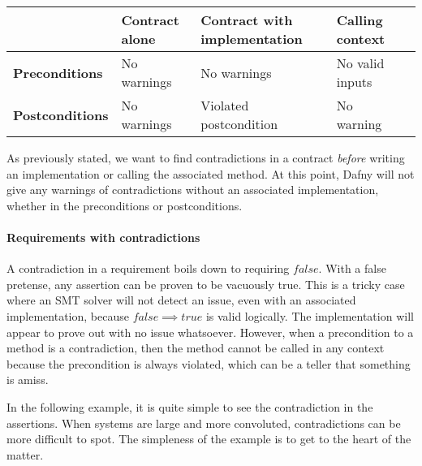 \documentclass{article}
\newif\ifcomments
\newcommand{\egm}[1]{\ifcomments\textcolor{orange}{egm: #1}\fi}
\newcommand{\cass}[1]{\ifcomments\textcolor{blue}{cass: #1}\fi}
\begin{document}
\begin{center}
\begin{tabularx}{0.9\textwidth} { 
  | >{\raggedright\arraybackslash}X 
  | >{\raggedright\arraybackslash}X 
  | >{\centering\arraybackslash}X 
  | >{\raggedright\arraybackslash}X 
  | >{\raggedleft\arraybackslash}X | }
     \hline
      & \textbf{Contract alone} & \textbf{Contract with implementation} & \textbf{Calling context} \\
     \hline
     \textbf{Preconditions} & No warnings  & No warnings & No valid inputs \\
     \hline
     \textbf{Postconditions}  & No warnings  & Violated postcondition & No warning \\
    \hline
\end{tabularx}
\label{tab:warn}
\end{center}

\egm{Add text to introduce the table and explain what the reader is looking it.}
\cass{Done}

As previously stated, we want to find contradictions in a contract {\it before} writing an implementation or calling the associated method. 
At this point, Dafny will not give any warnings of contradictions without an associated implementation, whether in the preconditions or postconditions. 

 \paragraph{Requirements with contradictions}

 A contradiction in a requirement boils down to requiring
 \(false\). With a false pretense, any assertion can be proven to be vacuously true. This is a tricky case
 where an SMT solver will not detect an issue, even with an associated implementation, because \(false \implies true\) is valid logically. The implementation
 will appear to prove out with no issue whatsoever. However, when 
 a precondition to a method is a contradiction, then the method cannot be called in any context because the precondition is 
 always violated, which can be a teller that something is amiss.

 In the following example, it is quite simple to see the contradiction in the assertions. When systems are large and more
convoluted, contradictions can be more difficult to spot. The simpleness of the example is to get to the heart of the matter.
\end{document}
